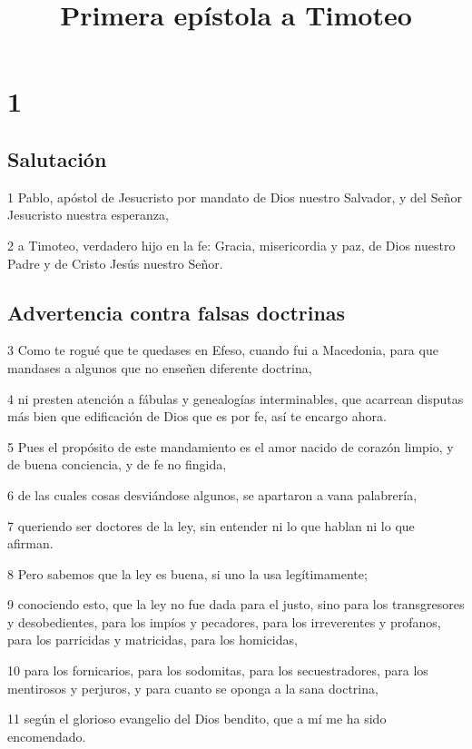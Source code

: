 
\title{Primera epístola a Timoteo}

\chapter{1}

\section*{Salutación}

\par 1 Pablo, apóstol de Jesucristo por mandato de Dios nuestro Salvador, y del Señor Jesucristo nuestra esperanza,
\par 2 a Timoteo, verdadero hijo en la fe: Gracia, misericordia y paz, de Dios nuestro Padre y de Cristo Jesús nuestro Señor.

\section*{Advertencia contra falsas doctrinas}

\par 3 Como te rogué que te quedases en Efeso, cuando fui a Macedonia, para que mandases a algunos que no enseñen diferente doctrina,
\par 4 ni presten atención a fábulas y genealogías interminables, que acarrean disputas más bien que edificación de Dios que es por fe, así te encargo ahora.
\par 5 Pues el propósito de este mandamiento es el amor nacido de corazón limpio, y de buena conciencia, y de fe no fingida,
\par 6 de las cuales cosas desviándose algunos, se apartaron a vana palabrería,
\par 7 queriendo ser doctores de la ley, sin entender ni lo que hablan ni lo que afirman.
\par 8 Pero sabemos que la ley es buena, si uno la usa legítimamente;
\par 9 conociendo esto, que la ley no fue dada para el justo, sino para los transgresores y desobedientes, para los impíos y pecadores, para los irreverentes y profanos, para los parricidas y matricidas, para los homicidas,
\par 10 para los fornicarios, para los sodomitas, para los secuestradores, para los mentirosos y perjuros, y para cuanto se oponga a la sana doctrina,
\par 11 según el glorioso evangelio del Dios bendito, que a mí me ha sido encomendado.

